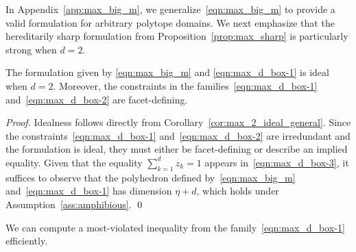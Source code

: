 \documentclass[smallextended]{svjour3}
\newcommand{\Scayley}{S_{\operatorname{cayley}}}
\begin{document}
In Appendix~\ref{app:max_big_m}, we generalize~\eqref{eqn:max_big_m} to provide a valid formulation for arbitrary polytope domains. We next emphasize that the hereditarily sharp formulation from Proposition~\ref{prop:max_sharp} is particularly strong when $d = 2$.

\begin{corollary}\label{cor:max_2_ideal}
The formulation given by \eqref{eqn:max_big_m} and \eqref{eqn:max_d_box-1} is ideal when $d = 2$. Moreover, the constraints in the families~\eqref{eqn:max_d_box-1} and~\eqref{eqn:max_d_box-2} are facet-defining.
\end{corollary}
\begin{proof}
Idealness follows directly from Corollary~\ref{cor:max_2_ideal_general}. Since the constraints~\eqref{eqn:max_d_box-1} and~\eqref{eqn:max_d_box-2} are irredundant and the formulation is ideal, they must either be facet-defining or describe an implied equality. Given that the equality $\sum_{k=1}^d z_k = 1$ appears in~\eqref{eqn:max_d_box-3}, it suffices to observe that the polyhedron defined by~\eqref{eqn:max_big_m} and~\eqref{eqn:max_d_box-1} has dimension $\eta + d$, which holds under Assumption~\ref{ass:amphibious}. %
\qed\end{proof}

We can compute a most-violated inequality from the family~\eqref{eqn:max_d_box-1} efficiently.
\end{document}
